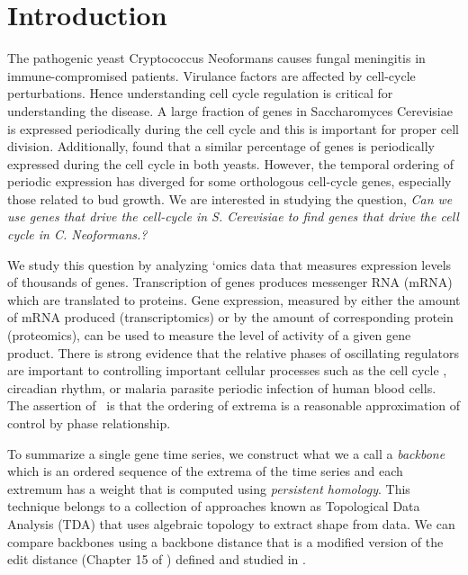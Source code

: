 \section{Introduction}
The pathogenic yeast Cryptococcus Neoformans causes fungal meningitis in immune-compromised patients. Virulance factors are affected by cell-cycle perturbations. Hence understanding cell cycle regulation is critical for understanding the disease. A large fraction of genes in Saccharomyces Cerevisiae is expressed periodically during the cell cycle and this is important for proper cell division. Additionally, \cite{KelliherInvestigating16} found that a similar percentage of genes is periodically expressed during the cell cycle in both yeasts. However, the temporal ordering of periodic expression has diverged for some orthologous cell-cycle genes, especially those related to bud growth. We are interested in studying the question, \textit{Can we use genes that drive the cell-cycle in S. Cerevisiae to find genes that drive the cell cycle in C. Neoformans.?}

We study this question by analyzing `omics data that measures expression levels of thousands of genes. Transcription of genes produces messenger RNA (mRNA) which are translated to proteins. Gene expression, measured by either the amount of mRNA produced (transcriptomics) or by the amount of corresponding protein (proteomics), can be used to measure the level of activity of a given gene product. There is strong evidence that the relative phases of oscillating regulators are important to controlling important cellular processes  such as the cell cycle \cite{SimmonsTranscription08}, circadian rhythm, or malaria parasite periodic infection of human blood cells. The assertion of~\cite{BerryUsing20,CumminsModel18} is that the ordering of extrema is a reasonable approximation of control by phase relationship.

To summarize a single gene time series, we construct what we a call a \emph{backbone} which is an ordered sequence of the extrema of the time series and each extremum has a weight that is computed using \emph{persistent homology}.  This technique belongs to a collection of approaches known as
Topological Data Analysis (TDA) that uses algebraic topology \cite{HatcherAlgebraic02, MunkresElements84} to extract shape from data. We can compare backbones using a backbone distance that is a modified version of the edit distance (Chapter 15 of \cite{CormenIntroduction09})  defined and studied in \cite{BeltonExtremal22}. 

